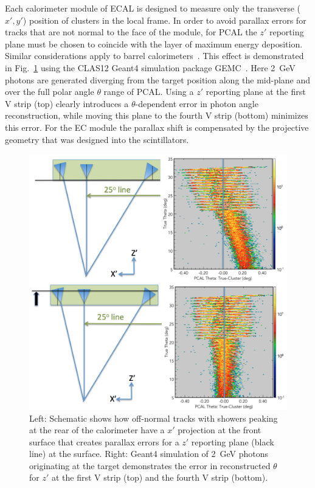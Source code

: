 Each calorimeter module of ECAL is designed to measure only the transverse ($x',y'$) position of clusters in the
local frame.  In order to avoid parallax errors for tracks that are not normal to the face of the module, for PCAL
the $z'$ reporting plane must be chosen to coincide with the layer of maximum energy deposition. Similar
considerations apply to barrel calorimeters~\cite{nima2018}. This effect is demonstrated in Fig.~\ref{fig:S6_1}
using the CLAS12 Geant4 simulation package GEMC~\cite{nim:sim}.  Here 2~GeV photons are generated diverging
from the target position along the mid-plane and over the full polar angle $\theta$ range of PCAL. Using a $z'$
reporting plane at the first V strip (top) clearly introduces a $\theta$-dependent error in photon angle
reconstruction, while moving this plane to the fourth V strip (bottom) minimizes this error. For the EC module the
parallax shift is compensated by the projective geometry that was designed into the scintillators.    

\begin{figure}[hbt]
\centering
\includegraphics[width=0.95\columnwidth,keepaspectratio]{img/S6_1.png}
\caption{Left: Schematic shows how off-normal tracks with showers peaking at the rear of the calorimeter have
  a $x'$ projection at the front surface that creates parallax errors for a $z'$ reporting plane (black line) at the
  surface. Right: Geant4 simulation of 2~GeV photons originating at the target demonstrates the error in
  reconstructed $\theta$ for $z'$ at the first V strip (top) and the fourth V strip (bottom).}
\label{fig:S6_1}
\end{figure}


